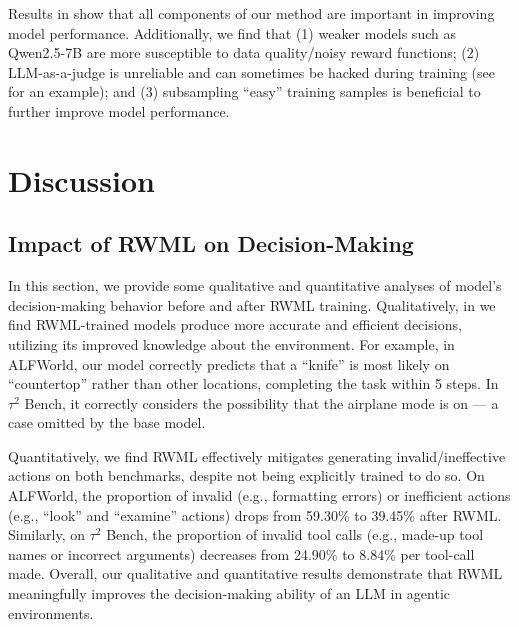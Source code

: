 \documentclass{article}
\theoremstyle{plain}
\theoremstyle{definition}
\theoremstyle{remark}
\newcommand{\shortmethod}[0]{RWML}
\newcommand{\wmrlshort}[0]{\shortmethod}
\begin{document}
Results in  show that all components of our method are important in improving model performance.
Additionally, we find that
(1) weaker models such as Qwen2.5-7B are more susceptible to data quality/noisy reward functions; (2) LLM-as-a-judge is unreliable and can sometimes be hacked during training (see  for an example); and (3) subsampling ``easy'' training samples is beneficial to further improve model performance.





\section{Discussion}
\label{sec:discussion}




\subsection{Impact of \wmrlshort{} on Decision-Making}
In this section, we provide some qualitative and quantitative analyses of model's decision-making behavior before and after \wmrlshort{} training.
Qualitatively, in  we find \wmrlshort{}-trained models produce more accurate and efficient decisions, utilizing its improved knowledge about the environment.
For example, in ALFWorld, our model correctly predicts that a ``knife'' is most likely on ``countertop'' rather than other locations, completing the task within 5 steps. 
In $\tau^2$ Bench, it correctly considers the possibility that the airplane mode is on --- a case omitted by the base model.

Quantitatively, we find \wmrlshort{} effectively mitigates generating invalid/ineffective actions on both benchmarks, despite not being explicitly trained to do so.
On ALFWorld, the proportion of invalid (e.g., formatting errors) or inefficient actions (e.g., ``look'' and ``examine'' actions) drops from 59.30\% to 39.45\% after \wmrlshort{}.
Similarly, on $\tau^2$ Bench, the proportion of invalid tool calls (e.g., made-up tool names or incorrect arguments) decreases from 24.90\% to 8.84\% per tool-call made.
Overall, our qualitative and quantitative results demonstrate that \wmrlshort{} meaningfully improves the decision-making ability of an LLM in agentic environments.
\end{document}
